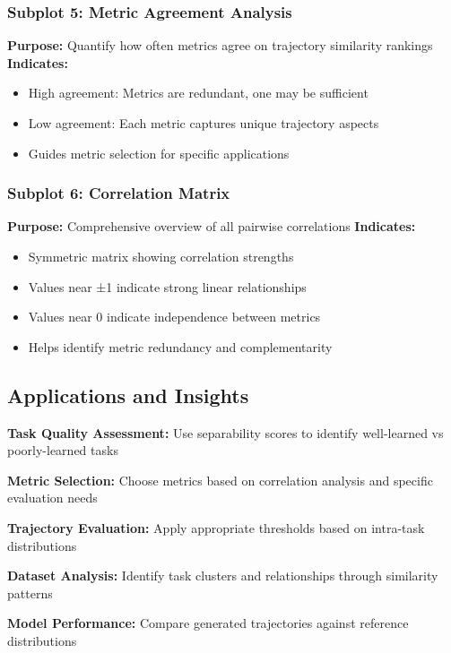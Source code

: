 \documentclass{article}
\begin{document}
\subsubsection{Subplot 5: Metric Agreement Analysis}
\textbf{Purpose:} Quantify how often metrics agree on trajectory similarity rankings
\textbf{Indicates:}
\begin{itemize}
    \item High agreement: Metrics are redundant, one may be sufficient
    \item Low agreement: Each metric captures unique trajectory aspects
    \item Guides metric selection for specific applications
\end{itemize}

\subsubsection{Subplot 6: Correlation Matrix}
\textbf{Purpose:} Comprehensive overview of all pairwise correlations
\textbf{Indicates:}
\begin{itemize}
    \item Symmetric matrix showing correlation strengths
    \item Values near ±1 indicate strong linear relationships
    \item Values near 0 indicate independence between metrics
    \item Helps identify metric redundancy and complementarity
\end{itemize}

\subsection{Applications and Insights}

\textbf{Task Quality Assessment:} Use separability scores to identify well-learned vs poorly-learned tasks

\textbf{Metric Selection:} Choose metrics based on correlation analysis and specific evaluation needs

\textbf{Trajectory Evaluation:} Apply appropriate thresholds based on intra-task distributions

\textbf{Dataset Analysis:} Identify task clusters and relationships through similarity patterns

\textbf{Model Performance:} Compare generated trajectories against reference distributions
\end{document}
